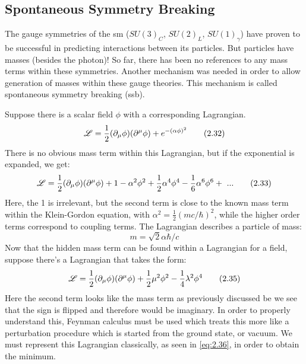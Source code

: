 \subsection{Spontaneous Symmetry Breaking}

The gauge symmetries of the \gls{sm} ($SU(3)_{C}$, $SU(2)_{L}$, $SU(1)_{\gamma}$) have proven to 
be successful in predicting interactions between its particles. But particles have masses (besides the photon)!
So far, there has been no references to any mass terms within these symmetries. Another mechanism 
was needed in order to allow generation of masses within these gauge theories. This mechanism is called 
spontaneous symmetry breaking (\gls{ssb}).
\par
Suppose there is a scalar field $\phi$ with a corresponding Lagrangian.
%
\begin{equation}\label{eq:2.32}
    \mathscr{L} = \frac{1}2(\partial_{\mu}\phi)(\partial^{\mu}\phi)+e^{-(\alpha\phi)^{2}}
\tag{2.32}
\end{equation}
%
There is no obvious mass term within this Lagrangian, but if the exponential is expanded, we get:
%
\begin{equation}\label{eq:2.33}
    \mathscr{L} = \frac{1}2(\partial_{\mu}\phi)(\partial^{\mu}\phi)+1-\alpha^{2}\phi^{2}+\frac{1}2\alpha^{4}\phi^{4}-\frac{1}6\alpha^{6}\phi^{6}+ \ ...
\tag{2.33}
\end{equation}
%
Here, the 1 is irrelevant, but the second term is close to the known mass term within the Klein-Gordon equation, with $\alpha^{2} = \frac{1}2(mc/\hbar)^{2}$, while the higher 
order terms correspond to coupling terms. The Lagrangian describes a particle of mass: 
%
\begin{equation}\label{eq:2.34}
    m=\sqrt{2}\alpha\hbar/c
\tag{2.34}
\end{equation}
%
Now that the hidden mass term can be found within a Lagrangian for a field, suppose there's a Lagrangian 
that takes the form: 
%
\begin{equation}\label{eq:2.35}
    \mathscr{L} = \frac{1}2(\partial_{\mu}\phi)(\partial^{\mu}\phi)+\frac{1}2\mu^{2}\phi^{2}-\frac{1}4\lambda^{2}\phi^{4}
\tag{2.35}
\end{equation}
%
Here the second term looks like the mass term as previously discussed be we see that the sign is flipped and 
therefore would be imaginary. In order to properly understand this, Feynman calculus must be used which 
treats this more like a perturbation procedure which is started from the ground state, or vacuum. We must represent this 
Lagrangian classically, as seen in \ref{eq:2.36}, in order to obtain the minimum.
